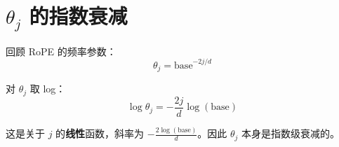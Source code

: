 \section{$\theta_j$ 的指数衰减}

回顾 RoPE 的频率参数：
$$
\theta_j = \text{base}^{-2j/d}
$$

对 $\theta_j$ 取 log：
$$
\log \theta_j = -\frac{2j}{d} \log(\text{base})
$$

这是关于 $j$ 的\textbf{线性}函数，斜率为 $-\frac{2\log(\text{base})}{d}$。因此 $\theta_j$ 本身是指数级衰减的。

